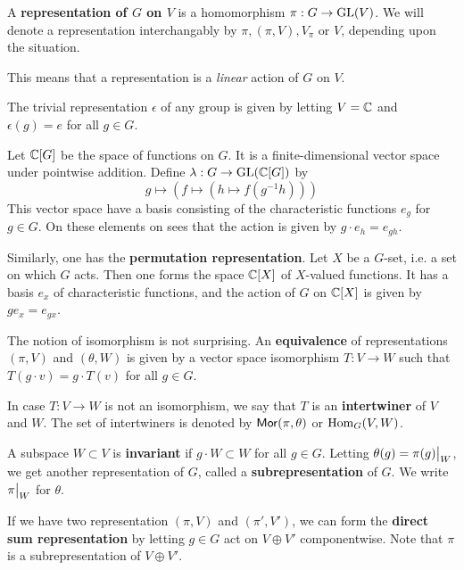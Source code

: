 \documentclass[11pt, english]{article}
\begin{document}
A \textbf{representation of $G$ on $V$} is a homomorphism $\pi:G \to \operatorname{GL}(V)$. We will denote a representation interchangably by $\pi, (\pi,V), V_\pi$ or $V$, depending upon the situation.

This means that a representation is a \emph{linear} action of $G$ on $V$.

\begin{example}
  The trivial representation $\epsilon$ of any group is given by letting $V= \mathbb{C}$ and $\epsilon(g)=e$ for all $g \in G$.
\end{example}

\begin{example}
Let $\mathbb{C}[G]$ be the space of functions on $G$. It is a finite-dimensional vector space under pointwise addition. Define $\lambda:G \to \operatorname{GL}(\mathbb{C}[G])$ by
\[
g \mapsto \left(f \mapsto (h \mapsto f(g^{-1}h)) \right)
\]
This vector space have a basis consisting of the characteristic functions $e_g$ for $g \in G$. On these elements on sees that the action is given by $g \cdot e_h = e_{gh}$. 

\end{example}
\begin{example}
 Similarly, one has the \textbf{permutation representation}. Let $X$ be a $G$-set, i.e. a set on which $G$ acts. Then one forms the space $\mathbb{C}[X]$ of $X$-valued functions. It has a basis $e_x$ of characteristic functions, and the action of $G$ on $\mathbb{C}[X]$ is given by $g e_x = e_{gx}$. 
\end{example}

The notion of isomorphism is not surprising. An \textbf{equivalence} of representations $(\pi,V)$ and $(\theta,W)$ is given by a vector space isomorphism $T:V \to W$ such that $T(g \cdot v) = g \cdot T(v)$ for all $g \in G$.

In case $T:V \to W$ is not an isomorphism, we say that $T$ is an \textbf{intertwiner} of $V$ and $W$. The set of intertwiners is denoted by $\mathsf{Mor}(\pi,\theta)$ or $\operatorname{Hom}_G(V,W)$.

A subspace $W \subset V$ is \textbf{invariant} if $g \cdot W \subset W$ for all $g \in G$. Letting $\theta(g) = \restr{\pi(g)}{W}$, we get another representation of $G$, called a \textbf{subrepresentation} of $G$. We write $\restr{\pi}{W}$ for $\theta$. 

If we have two representation $(\pi,V)$ and $(\pi',V')$, we can form the \textbf{direct sum representation} by letting $g \in G$ act on $V \oplus V'$ componentwise. Note that $\pi$ is a subrepresentation of $V \oplus V'$.
\end{document}
